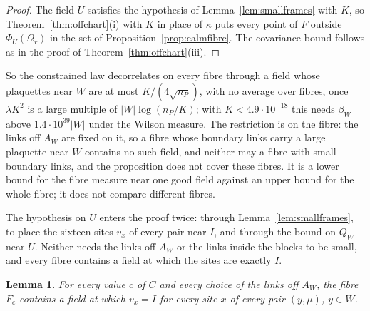 \documentclass[11pt]{amsart}
\newtheorem{lemma}[theorem]{Lemma}
\theoremstyle{definition}
\theoremstyle{remark}
\numberwithin{equation}{section}
\begin{document}
\begin{proof}
The field $U$ satisfies the hypothesis of Lemma~\ref{lem:smallframes} with
$K$, so Theorem~\ref{thm:offchart}(i) with $K$ in place of $\kappa$ puts
every point of $F$ outside $\Phi_U(\Omega_r)$ in the set of
Proposition~\ref{prop:calmfibre}. The covariance bound follows as in the
proof of Theorem~\ref{thm:offchart}(iii).
\end{proof}

So the constrained law decorrelates on every fibre through a field whose
plaquettes near $W$ are at most $K/(4\sqrt{n_P})$, with no average over
fibres, once $\lambda K^2$ is a large multiple of $|W|\log(n_P/K)$; with
$K<4.9\cdot10^{-18}$ this needs $\beta_W$ above $1.4\cdot10^{39}|W|$ under the
Wilson measure. The restriction is on the fibre: the links off $A_W$ are
fixed on it, so a fibre whose boundary links carry a large plaquette near
$W$ contains no such field, and neither may a fibre with small boundary
links, and the proposition does not cover these fibres. It is a lower bound
for the fibre measure near one good field against an upper bound for the
whole fibre; it does not compare different fibres.

The hypothesis on $U$ enters the proof twice: through
Lemma~\ref{lem:smallframes}, to place the sixteen sites $v_x$ of every pair
near $I$, and through the bound on $Q_W$ near $U$. Neither needs the links
off $A_W$ or the links inside the blocks to be small, and every fibre
contains a field at which the sites are exactly $I$.

\begin{lemma}\label{lem:alignedfield}
For every value $c$ of $C$ and every choice of the links off $A_W$, the
fibre $F_c$ contains a field at which $v_x=I$ for every site $x$ of every
pair $(y,\mu)$, $y\in W$.
\end{lemma}
\end{document}
